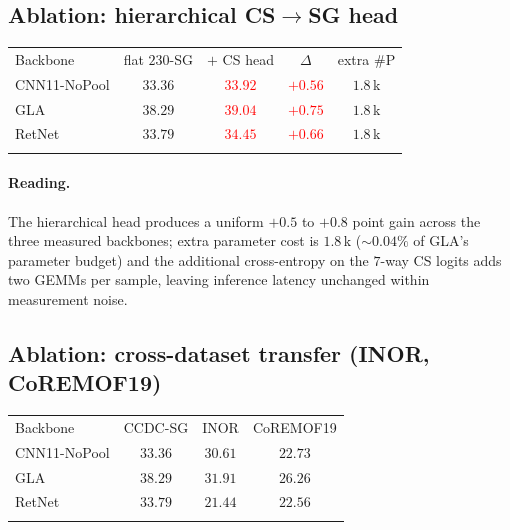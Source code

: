 \documentclass[final]{ws-ijwmip}
\begin{document}
\subsection{Ablation: hierarchical CS$\to$SG head}

\begin{table}[!htbp]
{\begin{tabular}{lcccc}
\toprule
Backbone & flat $230$-SG & $+$ CS head & $\Delta$ & extra \#P \\
\colrule
CNN11-NoPool & $33.36$ & \textcolor{red}{$33.92$}         & \textcolor{red}{$+0.56$} & $1.8\,$k \\
GLA          & $38.29$ & \textcolor{red}{$\mathbf{39.04}$} & \textcolor{red}{$+0.75$} & $1.8\,$k \\
RetNet       & $33.79$ & \textcolor{red}{$34.45$}         & \textcolor{red}{$+0.66$} & $1.8\,$k \\
\botrule
\end{tabular}}
\end{table}

\paragraph{Reading.}
The hierarchical head produces a uniform $+0.5$ to $+0.8$ point gain
across the three measured backbones; extra parameter cost is $1.8\,$k
($\sim 0.04\%$ of GLA's parameter budget) and the additional cross-entropy
on the $7$-way CS logits adds two GEMMs per sample, leaving inference
latency unchanged within measurement noise.


\subsection{Ablation: cross-dataset transfer (INOR, CoREMOF19)}

\begin{table}[!htbp]
{\begin{tabular}{lccc}
\toprule
Backbone & CCDC-SG & INOR & CoREMOF19 \\
\colrule
CNN11-NoPool & $33.36$ & $30.61$         & $22.73$ \\
GLA          & $\mathbf{38.29}$ & $\mathbf{31.91}$ & $\mathbf{26.26}$ \\
RetNet       & $33.79$ & $21.44$         & $22.56$ \\
\botrule
\end{tabular}}
\end{table}
\end{document}
